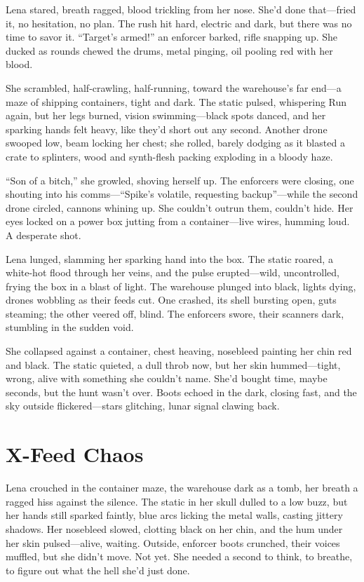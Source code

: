 \documentclass[12pt]{book}
\begin{document}
Lena stared, breath ragged, blood trickling from her nose. She’d done that—fried it, no hesitation, no plan. The rush hit hard, electric and dark, but there was no time to savor it. “Target’s armed!” an enforcer barked, rifle snapping up. She ducked as rounds chewed the drums, metal pinging, oil pooling red with her blood.

She scrambled, half-crawling, half-running, toward the warehouse’s far end—a maze of shipping containers, tight and dark. The static pulsed, whispering Run again, but her legs burned, vision swimming—black spots danced, and her sparking hands felt heavy, like they’d short out any second. Another drone swooped low, beam locking her chest; she rolled, barely dodging as it blasted a crate to splinters, wood and synth-flesh packing exploding in a bloody haze.

“Son of a bitch,” she growled, shoving herself up. The enforcers were closing, one shouting into his comms—“Spike’s volatile, requesting backup”—while the second drone circled, cannons whining up. She couldn’t outrun them, couldn’t hide. Her eyes locked on a power box jutting from a container—live wires, humming loud. A desperate shot.

Lena lunged, slamming her sparking hand into the box. The static roared, a white-hot flood through her veins, and the pulse erupted—wild, uncontrolled, frying the box in a blast of light. The warehouse plunged into black, lights dying, drones wobbling as their feeds cut. One crashed, its shell bursting open, guts steaming; the other veered off, blind. The enforcers swore, their scanners dark, stumbling in the sudden void.

She collapsed against a container, chest heaving, nosebleed painting her chin red and black. The static quieted, a dull throb now, but her skin hummed—tight, wrong, alive with something she couldn’t name. She’d bought time, maybe seconds, but the hunt wasn’t over. Boots echoed in the dark, closing fast, and the sky outside flickered—stars glitching, lunar signal clawing back.

\section{X-Feed Chaos}

Lena crouched in the container maze, the warehouse dark as a tomb, her breath a ragged hiss against the silence. The static in her skull dulled to a low buzz, but her hands still sparked faintly, blue arcs licking the metal walls, casting jittery shadows. Her nosebleed slowed, clotting black on her chin, and the hum under her skin pulsed---alive, waiting. Outside, enforcer boots crunched, their voices muffled, but she didn’t move. Not yet. She needed a second to think, to breathe, to figure out what the hell she’d just done.
\end{document}
